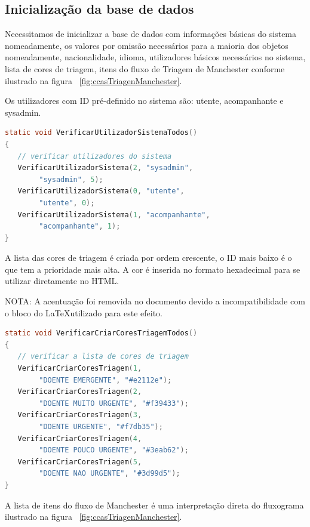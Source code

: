 \subsection{Inicialização da base de dados}

Necessitamos de inicializar a base de dados com informações básicas do sistema nomeadamente, os valores por omissão necessários para a maioria dos objetos nomeadamente, nacionalidade, idioma, utilizadores básicos necessários no sistema, lista de cores de triagem, itens do fluxo de Triagem de Manchester conforme ilustrado na figura ~\ref{fig:ccasTriagenManchester}.

Os utilizadores com ID pré-definido no sistema são: utente, acompanhante e sysadmin.

\begin{lstlisting}[language={c},
	caption={Verificar e/ou Inserir utilizadores iniciais no sistema},
	label=lst:usrsistema]
static void VerificarUtilizadorSistemaTodos()
{
   // verificar utilizadores do sistema
   VerificarUtilizadorSistema(2, "sysadmin", 
   		"sysadmin", 5);
   VerificarUtilizadorSistema(0, "utente", 
   		"utente", 0);
   VerificarUtilizadorSistema(1, "acompanhante", 
   		"acompanhante", 1);
}
\end{lstlisting}

A lista das cores de triagem é criada por ordem crescente, o ID mais baixo é o que tem a prioridade mais alta. A cor é inserida no formato hexadecimal para se utilizar diretamente no HTML.

\noindent NOTA: A acentuação foi removida no documento devido a incompatibilidade com o bloco do \LaTeX utilizado para este efeito.

\begin{lstlisting}[language={c},
	caption={Verificar e/ou Inserir lista de cores e prioridades},
	label=lst:corestriagem]
static void VerificarCriarCoresTriagemTodos()
{
   // verificar a lista de cores de triagem
   VerificarCriarCoresTriagem(1, 
   		"DOENTE EMERGENTE", "#e2112e");
   VerificarCriarCoresTriagem(2, 
   		"DOENTE MUITO URGENTE", "#f39433");
   VerificarCriarCoresTriagem(3, 
   		"DOENTE URGENTE", "#f7db35");
   VerificarCriarCoresTriagem(4, 
   		"DOENTE POUCO URGENTE", "#3eab62");
   VerificarCriarCoresTriagem(5, 
   		"DOENTE NAO URGENTE", "#3d99d5");
}
\end{lstlisting}

A lista de itens do fluxo de Manchester é uma interpretação direta do fluxograma ilustrado na figura ~\ref{fig:ccasTriagenManchester}.

